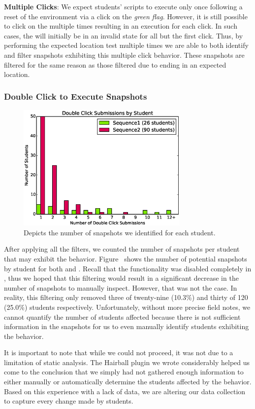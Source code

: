 \textbf{Multiple \net{} Clicks}: We expect students' scripts to execute only
once \netclicked{} following a reset of the environment via a click on the
\emph{green flag}. However, it is still possible to click on the \net{}
multiple times resulting in an execution for each click. In such cases, the
\net{} will initially be in an invalid state for all but the first click. Thus,
by performing the expected location test multiple times we are able to both
identify and filter snapshots exhibiting this multiple \net{} click
behavior. These snapshots are filtered for the same reason as those filtered
due to ending in an expected location.

\subsubsection{Double Click to Execute Snapshots}

\begin{figure}[!t]
\centering \includegraphics[width=3.3in]{graphs/dc_submissions.eps}
\caption{Depicts the number of \dce{} snapshots we identified for each
  student.}
\end{figure}

After applying all the filters, we counted the number of snapshots per student
that may exhibit the \dce{} behavior. Figure~ shows
the number of potential snapshots by student for both \sone{} and
\stwo{}. Recall that the \dce{} functionality was disabled completely in
\stwo{}, thus we hoped that this filtering would result in a significant
decrease in the number of snapshots to manually inspect. However, that was not
the case. In reality, this filtering only removed three of twenty-nine (10.3\%)
and thirty of 120 (25.0\%) students respectively. Unfortunately, without more
precise field notes, we cannot quantify the number of students affected because
there is not sufficient information in the snapshots for us to even manually
identify students exhibiting the \dce{} behavior.

It is important to note that while we could not proceed, it was not due to a
limitation of static analysis. The Hairball plugin we wrote considerably helped
us come to the conclusion that we simply had not gathered enough information to
either manually or automatically determine the students affected by the \dce{}
behavior. Based on this experience with a lack of data, we are altering our
data collection to capture every change made by students.
